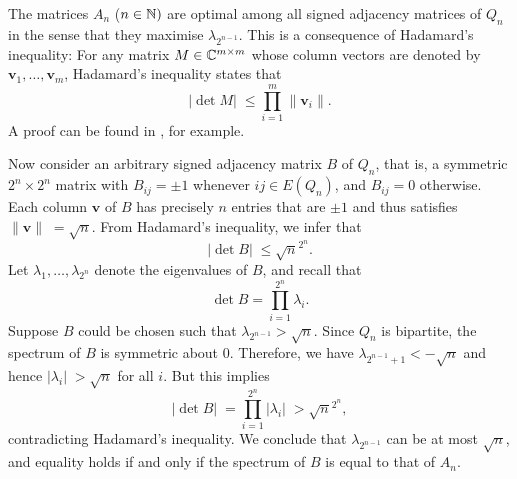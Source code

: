 \begin{remark}
    The matrices $A_n$ ($n \in \mathbb{N})$ are optimal among all signed adjacency matrices of $Q_n$ in the sense that they maximise $\lambda_{2^{n - 1}}$.
    This is a consequence of Hadamard's inequality:
    For any matrix $M \in \mathbb{C}^{m \times m}$ whose column vectors are denoted by $\bm{v}_1, \dots, \bm{v}_m$, Hadamard's inequality states that
    \begin{equation*}
        |\det M|\; \le \prod \limits_{i = 1}^m \| \bm{v}_i\|.
    \end{equation*}
    A proof can be found in \cite[(9.66)]{linearalgebradoneright}, for example.

    Now consider an arbitrary signed adjacency matrix $B$ of $Q_n$, that is, a symmetric $2^n \times 2^n$ matrix with $B_{ij} = \pm 1$ whenever $ij \in E(Q_n)$, and $B_{ij} = 0$ otherwise.
    Each column $\bm{v}$ of $B$ has precisely $n$ entries that are $\pm 1$ and thus satisfies $\|\bm{v}\|\; = \sqrt{n}$.
    From Hadamard's inequality, we infer that
    \begin{equation*}
        |\det B |\; \le \sqrt{n}^{2^n}.
    \end{equation*}
    Let $\lambda_1, \dots, \lambda_{2^n}$ denote the eigenvalues of $B$, and recall that 
    \begin{equation*}
        \det B = \prod_{i = 1}^{2^n} \lambda_i.
    \end{equation*}
    Suppose $B$ could be chosen such that $\lambda_{2^{n - 1}} > \sqrt{n}$. 
    Since $Q_n$ is bipartite, the spectrum of $B$ is symmetric about $0$. 
    Therefore, we have $\lambda_{2^{n - 1} + 1} < -\sqrt{n}$ and hence $|\lambda_i|\; > \sqrt{n}$ for all $i$.
    But this implies
    \begin{equation*}
        |\det B|\; = \prod \limits_{i = 1}^{2^n} | \lambda_i |\; > \sqrt{n}^{2^n}, 
    \end{equation*}
    contradicting Hadamard's inequality.
    We conclude that $\lambda_{2^{n - 1}}$ can be at most $\sqrt{n}$, and equality holds if and only if the spectrum of $B$ is equal to that of $A_n$.
\end{remark}